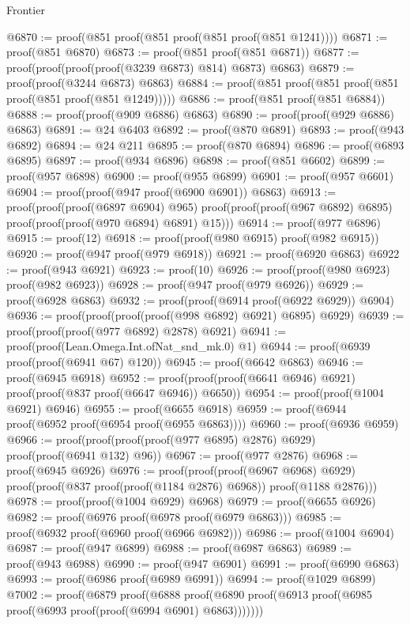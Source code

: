 \begin{lexlean}{Frontier}
\begin{coremodule}
@6870 := proof(@851 proof(@851 proof(@851 proof(@851 @1241))))
@6871 := proof(@851 @6870)
@6873 := proof(@851 proof(@851 @6871))
@6877 := proof(proof(proof(proof(@3239 @6873) @814) @6873) @6863)
@6879 := proof(proof(@3244 @6873) @6863)
@6884 := proof(@851 proof(@851 proof(@851 proof(@851 proof(@851 @1249)))))
@6886 := proof(@851 proof(@851 @6884))
@6888 := proof(proof(@909 @6886) @6863)
@6890 := proof(proof(@929 @6886) @6863)
@6891 := @24 @6403
@6892 := proof(@870 @6891)
@6893 := proof(@943 @6892)
@6894 := @24 @211
@6895 := proof(@870 @6894)
@6896 := proof(@6893 @6895)
@6897 := proof(@934 @6896)
@6898 := proof(@851 @6602)
@6899 := proof(@957 @6898)
@6900 := proof(@955 @6899)
@6901 := proof(@957 @6601)
@6904 := proof(proof(@947 proof(@6900 @6901)) @6863)
@6913 := proof(proof(proof(@6897 @6904) @965)
      proof(proof(proof(@967 @6892) @6895) proof(proof(proof(@970 @6894) @6891) @15)))
@6914 := proof(@977 @6896)
@6915 := proof(12)
@6918 := proof(proof(@980 @6915) proof(@982 @6915))
@6920 := proof(@947 proof(@979 @6918))
@6921 := proof(@6920 @6863)
@6922 := proof(@943 @6921)
@6923 := proof(10)
@6926 := proof(proof(@980 @6923) proof(@982 @6923))
@6928 := proof(@947 proof(@979 @6926))
@6929 := proof(@6928 @6863)
@6932 := proof(proof(@6914 proof(@6922 @6929)) @6904)
@6936 := proof(proof(proof(proof(@998 @6892) @6921) @6895) @6929)
@6939 := proof(proof(proof(@977 @6892) @2878) @6921)
@6941 := proof(proof(Lean.Omega.Int.ofNat_snd_mk.{0}) @1)
@6944 := proof(@6939 proof(proof(@6941 @67) @120))
@6945 := proof(@6642 @6863)
@6946 := proof(@6945 @6918)
@6952 := proof(proof(proof(@6641 @6946) @6921) proof(proof(@837 proof(@6647 @6946)) @6650))
@6954 := proof(proof(@1004 @6921) @6946)
@6955 := proof(@6655 @6918)
@6959 := proof(@6944 proof(@6952 proof(@6954 proof(@6955 @6863))))
@6960 := proof(@6936 @6959)
@6966 := proof(proof(proof(proof(@977 @6895) @2876) @6929) proof(proof(@6941 @132) @96))
@6967 := proof(@977 @2876)
@6968 := proof(@6945 @6926)
@6976 := proof(proof(proof(@6967 @6968) @6929)
      proof(proof(@837 proof(proof(@1184 @2876) @6968)) proof(@1188 @2876)))
@6978 := proof(proof(@1004 @6929) @6968)
@6979 := proof(@6655 @6926)
@6982 := proof(@6976 proof(@6978 proof(@6979 @6863)))
@6985 := proof(@6932 proof(@6960 proof(@6966 @6982)))
@6986 := proof(@1004 @6904)
@6987 := proof(@947 @6899)
@6988 := proof(@6987 @6863)
@6989 := proof(@943 @6988)
@6990 := proof(@947 @6901)
@6991 := proof(@6990 @6863)
@6993 := proof(@6986 proof(@6989 @6991))
@6994 := proof(@1029 @6899)
@7002 := proof(@6879
      proof(@6888
          proof(@6890 proof(@6913 proof(@6985 proof(@6993 proof(proof(@6994 @6901) @6863)))))))

\end{coremodule}
\end{lexlean}
